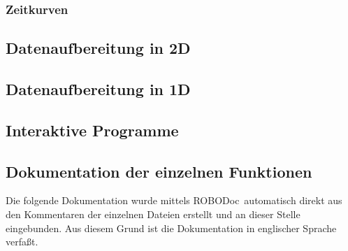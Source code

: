 \documentclass[a4paper]{refart}
\newcommand{\robodoc}{\textsf{ROBODoc}}
\begin{document}
\subsubsection{Zeitkurven}


\subsection{Datenaufbereitung in 2D}


\subsection{Datenaufbereitung in 1D}


\subsection{Interaktive Programme}


\begin{appendix}

\begin{fullpage}

\section{Dokumentation der einzelnen Funktionen}

Die folgende Dokumentation wurde mittels \robodoc\ automatisch direkt aus den 
Kommentaren der einzelnen Dateien erstellt und an dieser Stelle eingebunden. 
Aus diesem Grund ist die Dokumentation in englischer Sprache verfaßt.


\scriptsize


\end{fullpage}
\end{appendix}
\end{document}
